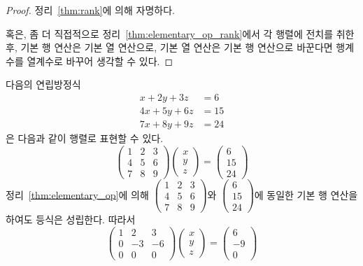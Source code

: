 \documentclass[unfonts,oneside,a4paper]{oblivoir}
\theoremstyle{definition}
\theoremstyle{theorem}
\theoremstyle{theorem}
\theoremstyle{remark}
\theoremstyle{remark}
\theoremstyle{remark}
\theoremstyle{remark}
\begin{document}
\begin{proof}
    정리~\ref{thm:rank}에 의해 자명하다.

    혹은, 좀 더 직접적으로 정리~\ref{thm:elementary_op_rank}에서 각 행렬에 전치를 취한 후, 기본 행 연산은 기본 열 연산으로, 기본 열 연산은 기본 행 연산으로 바꾼다면 행계수를 열계수로 바꾸어 생각할 수 있다.
\end{proof}

다음의 연립방정식
\begin{align*}
    x + 2y + 3z &= 6\\
    4x + 5y + 6z &= 15\\
    7x + 8y + 9z &= 24
\end{align*}
은 다음과 같이 행렬로 표현할 수 있다.
\begin{equation*}
    \begin{pmatrix}
        1 & 2 & 3\\
        4 & 5 & 6\\
        7 & 8 & 9
    \end{pmatrix}
    \begin{pmatrix}
        x\\
        y\\
        z
    \end{pmatrix}
    =
    \begin{pmatrix}
        6\\
        15\\
        24
    \end{pmatrix}
\end{equation*}
   정리~\ref{thm:elementary_op}에 의해 $\begin{pmatrix}1&2&3\\4&5&6\\7&8&9\end{pmatrix}$와 $\begin{pmatrix}6\\15\\24\end{pmatrix}$에 동일한 기본 행 연산을 하여도 등식은 성립한다.
   따라서
   \begin{equation*}
        \begin{pmatrix}
            1 & 2& 3\\
            0 & -3 & -6\\
            0 & 0 & 0
        \end{pmatrix}
        \begin{pmatrix}
            x\\
            y\\
            z
        \end{pmatrix}
        =
        \begin{pmatrix}
            6\\
            -9\\
            0
        \end{pmatrix}
   \end{equation*}
\end{document}
